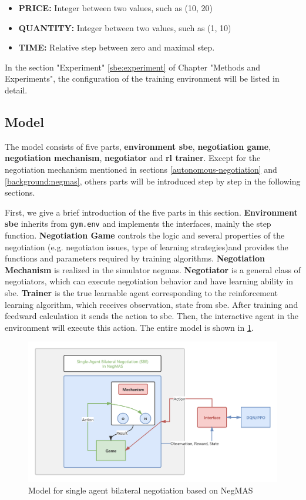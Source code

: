 \begin{itemize}
	\item \textbf{PRICE:} Integer between two values, such as (10, 20)
	\item \textbf{QUANTITY:} Integer between two values, such as (1, 10)
	\item \textbf{TIME:} Relative step between zero and maximal step.
\end{itemize}


In the section "Experiment" \ref{sbe:experiment} of Chapter "Methods and Experiments", the configuration of the training environment will be listed in detail.
 
\subsection{Model}
The model consists of five parts, \textbf{environment \gls{sbe}}, \textbf{negotiation game}, \textbf{negotiation mechanism}, \textbf{negotiator} and \textbf{\gls{rl} trainer}.
Except for the negotiation mechanism mentioned in sections \ref{autonomous-negotiation} and \ref{background:negmas}, others parts will be introduced step by step in the following sections. 

First, we give a brief introduction of the five parts in this section.
\textbf{Environment \gls{sbe}} inherits from \texttt{gym.env} and implements the interfaces, mainly the step function. 
\textbf{Negotiation Game} controls the logic and several properties of the negotiation (e.g. negotiaton issues, type of learning strategies)and provides the functions and parameters required by training algorithms.
\textbf{Negotiation Mechanism} is realized in the simulator \gls{negmas}.
\textbf{Negotiator} is a general class of negotiators, which can execute negotiation behavior and have learning ability in \gls{sbe}.
\textbf{Trainer} is the true learnable agent corresponding to the reinforcement learning algorithm, which receives observation, state from \gls{sbe}. After training and feedward calculation it sends the action to \gls{sbe}. Then, the interactive agent in the environment will execute this action. The entire model is shown in \ref{fig:environment-single-agent}.
\begin{figure}[htbp]
\centering
\includegraphics[width=1.0\textwidth]{./images/sbe.png}
\caption{Model for single agent bilateral negotiation based on NegMAS}
\label{fig:environment-single-agent}
\end{figure}

